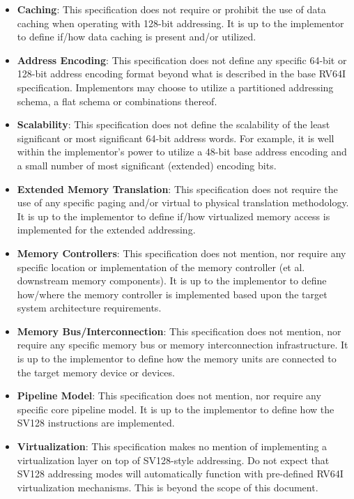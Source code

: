 \documentclass{article}
\begin{document}
\begin{itemize}
\item \textbf{Caching}: This specification does not require or prohibit the use of data caching 
when operating with 128-bit addressing.  It is up to the implementor to define if/how data caching 
is present and/or utilized.  

\item \textbf{Address Encoding}: This specification does not define any specific 64-bit or 128-bit 
address encoding format beyond what is described in the base RV64I specification.  Implementors 
may choose to utilize a partitioned addressing schema, a flat schema or combinations thereof.    

\item \textbf{Scalability}: This specification does not define the scalability of the least significant 
or most significant 64-bit address words.  For example, it is well within the implementor's power to 
utilize a 48-bit base address encoding and a small number of most significant (extended) encoding bits.

\item \textbf{Extended Memory Translation}: This specification does not require the use of any 
specific paging and/or virtual to physical translation methodology.  It is up to the implementor to define 
if/how virtualized memory access is implemented for the extended addressing.

\item \textbf{Memory Controllers}: This specification does not mention, nor require any specific 
location or implementation of the memory controller (et al. downstream memory components).  It is 
up to the implementor to define how/where the memory controller is implemented based upon the 
target system architecture requirements.

\item \textbf{Memory Bus/Interconnection}: This specification does not mention, nor require any 
specific memory bus or memory interconnection infrastructure.  It is up to the implementor to define 
how the memory units are connected to the target memory device or devices.

\item \textbf{Pipeline Model}: This specification does not mention, nor require any specific 
core pipeline model.  It is up to the implementor to define how the SV128 instructions are 
implemented.

\item \textbf{Virtualization}: This specification makes no mention of implementing a virtualization 
layer on top of SV128-style addressing.  Do not expect that SV128 addressing modes will 
automatically function with pre-defined RV64I virtualization mechanisms.  This is beyond the 
scope of this document.


\end{itemize}
\end{document}
